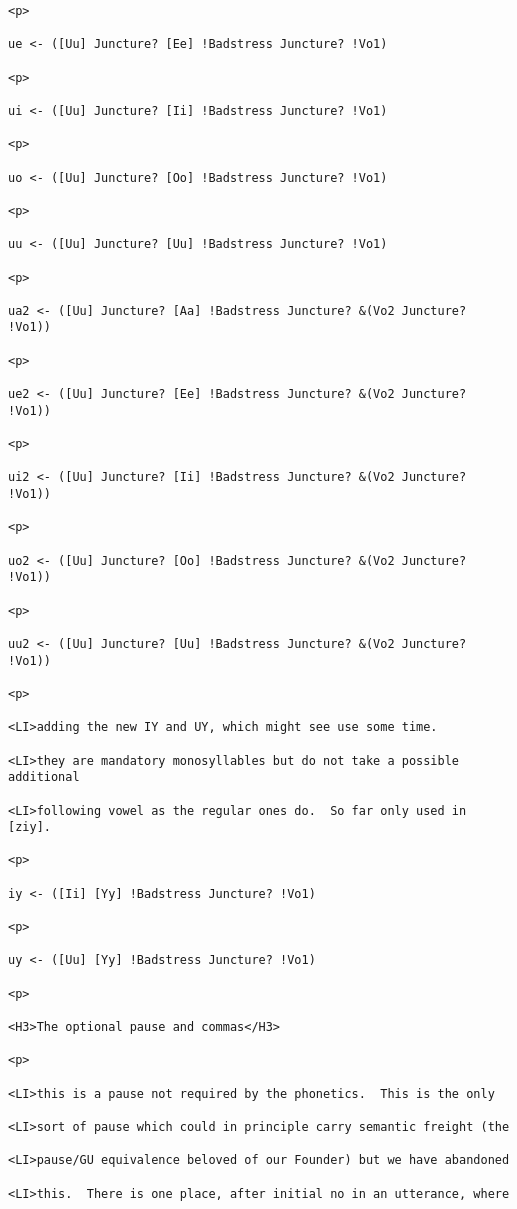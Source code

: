 \documentclass[12pt]{article}
\begin{document}
\begin{lstlisting}
<p>

ue <- ([Uu] Juncture? [Ee] !Badstress Juncture? !Vo1)

<p>

ui <- ([Uu] Juncture? [Ii] !Badstress Juncture? !Vo1)

<p>

uo <- ([Uu] Juncture? [Oo] !Badstress Juncture? !Vo1)

<p>

uu <- ([Uu] Juncture? [Uu] !Badstress Juncture? !Vo1)

<p>

ua2 <- ([Uu] Juncture? [Aa] !Badstress Juncture? &(Vo2 Juncture? !Vo1))

<p>

ue2 <- ([Uu] Juncture? [Ee] !Badstress Juncture? &(Vo2 Juncture? !Vo1))

<p>

ui2 <- ([Uu] Juncture? [Ii] !Badstress Juncture? &(Vo2 Juncture? !Vo1))

<p>

uo2 <- ([Uu] Juncture? [Oo] !Badstress Juncture? &(Vo2 Juncture? !Vo1))

<p>

uu2 <- ([Uu] Juncture? [Uu] !Badstress Juncture? &(Vo2 Juncture? !Vo1))

<p>

<LI>adding the new IY and UY, which might see use some time.

<LI>they are mandatory monosyllables but do not take a possible additional

<LI>following vowel as the regular ones do.  So far only used in [ziy].

<p>

iy <- ([Ii] [Yy] !Badstress Juncture? !Vo1)

<p>

uy <- ([Uu] [Yy] !Badstress Juncture? !Vo1)

<p>

<H3>The optional pause and commas</H3>

<p>

<LI>this is a pause not required by the phonetics.  This is the only

<LI>sort of pause which could in principle carry semantic freight (the

<LI>pause/GU equivalence beloved of our Founder) but we have abandoned

<LI>this.  There is one place, after initial no in an utterance, where


\end{lstlisting}
\end{document}
